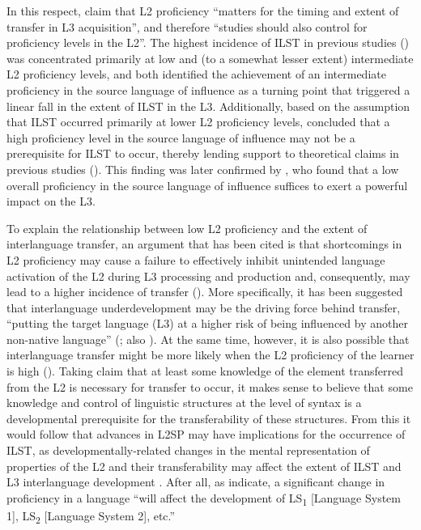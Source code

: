 \documentclass[output=paper,modfonts,nonflat, newtxmath]{langsci/langscibook}
\begin{document}
In this respect, \citet[24]{MontrulEtAl2011} claim that L2 proficiency “matters for the timing and extent of transfer in L3 acquisition”, and therefore “studies should also control for proficiency levels in the L2”. The highest incidence of ILST in previous studies (\citealt{Sánchez2011,SánchezBardel2017}) was concentrated primarily at low and (to a somewhat lesser extent) intermediate L2 proficiency levels, and both identified the achievement of an intermediate proficiency in the source language of influence as a turning point that triggered a linear fall in the extent of ILST in the L3. Additionally, based on the assumption that ILST occurred primarily at lower L2 proficiency levels, \citet{Sánchez2011} concluded that a high proficiency level in the source language of influence may not be a prerequisite for ILST to occur, thereby lending support to theoretical claims in previous studies (\citealt{DeAngelisSelinker2001,DeAngelis2007,Ringbom2007,Rast2010,Sánchez2012}). This finding was later confirmed by \citet{SánchezBardel2017}, who found that a low overall proficiency in the source language of influence suffices to exert a powerful impact on the L3.

To explain the relationship between low L2 proficiency and the extent of interlanguage transfer, an argument that has been cited is that shortcomings in L2 proficiency may cause a failure to effectively inhibit unintended language activation of the L2 during L3 processing and production and, consequently, may lead to a higher incidence of transfer (\citealt{Shanon1991,Dewaele2001,DeBot2004}). More specifically, it has been suggested that interlanguage underdevelopment may be the driving force behind transfer, “putting the target language (L3) at a higher risk of being influenced by another non-native language” (\citealt[241]{SánchezBardel2017}; also \citealt{Leung2003,Leung2005,Sánchez2011}). At the same time, however, it is also possible that interlanguage transfer might be more likely when the L2 proficiency of the learner is high (\citealt{Odlin1990,Dewaele1998,Dentler2000,Hammarberg2001,Ringbom2001,Ringbom2007}). Taking  claim that at least some knowledge of the element transferred from the L2 is necessary for transfer to occur, it makes sense to believe that some knowledge and control of linguistic structures at the level of syntax is a developmental prerequisite for the transferability of these structures. From this it would follow that advances in L2SP may have implications for the occurrence of ILST, as developmentally-related changes in the mental representation of properties of the L2 and their transferability may affect the extent of ILST and L3 interlanguage development \citep{Sánchez2011}. After all, as \citet[40]{HerdinaJessner2002} indicate, a significant change in proficiency in a language “will affect the development of LS\textsubscript{1} [Language System 1], LS\textsubscript{2} [Language System 2], etc.”
\end{document}
